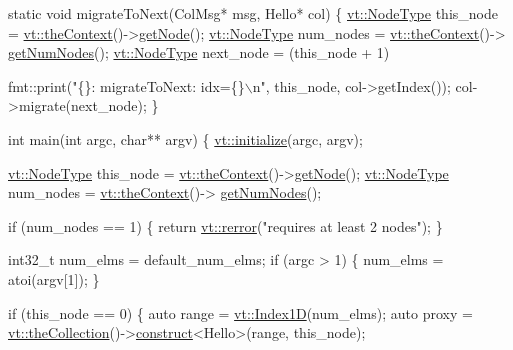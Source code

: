 \begin{DoxyCodeInclude}
\textcolor{keyword}{static} \textcolor{keywordtype}{void} migrateToNext(ColMsg* msg, Hello* col) \{
  \hyperlink{namespacevt_a866da9d0efc19c0a1ce79e9e492f47e2}{vt::NodeType} this\_node = \hyperlink{namespacevt_a26551fe0e6e6a1371111df5b12c7e92c}{vt::theContext}()->\hyperlink{structvt_1_1ctx_1_1_context_a0d52c263ce8516546a67443d9a86fa5f}{getNode}();
  \hyperlink{namespacevt_a866da9d0efc19c0a1ce79e9e492f47e2}{vt::NodeType} num\_nodes = \hyperlink{namespacevt_a26551fe0e6e6a1371111df5b12c7e92c}{vt::theContext}()->
      \hyperlink{structvt_1_1ctx_1_1_context_a7f41071aadf6d5fa9e1b6c703c5ff19d}{getNumNodes}();
  \hyperlink{namespacevt_a866da9d0efc19c0a1ce79e9e492f47e2}{vt::NodeType} next\_node = (this\_node + 1) %

  fmt::print(\textcolor{stringliteral}{"\{\}: migrateToNext: idx=\{\}\(\backslash\)n"}, this\_node, col->getIndex());
  col->migrate(next\_node);
\}

\textcolor{keywordtype}{int} main(\textcolor{keywordtype}{int} argc, \textcolor{keywordtype}{char}** argv) \{
  \hyperlink{namespacevt_aaa266774ea8339c58be0202b00fafa62}{vt::initialize}(argc, argv);

  \hyperlink{namespacevt_a866da9d0efc19c0a1ce79e9e492f47e2}{vt::NodeType} this\_node = \hyperlink{namespacevt_a26551fe0e6e6a1371111df5b12c7e92c}{vt::theContext}()->\hyperlink{structvt_1_1ctx_1_1_context_a0d52c263ce8516546a67443d9a86fa5f}{getNode}();
  \hyperlink{namespacevt_a866da9d0efc19c0a1ce79e9e492f47e2}{vt::NodeType} num\_nodes = \hyperlink{namespacevt_a26551fe0e6e6a1371111df5b12c7e92c}{vt::theContext}()->
      \hyperlink{structvt_1_1ctx_1_1_context_a7f41071aadf6d5fa9e1b6c703c5ff19d}{getNumNodes}();

  \textcolor{keywordflow}{if} (num\_nodes == 1) \{
    \textcolor{keywordflow}{return} \hyperlink{namespacevt_aff96ace008dc847d4c0f44cfa5dfb3a0}{vt::rerror}(\textcolor{stringliteral}{"requires at least 2 nodes"});
  \}

  int32\_t num\_elms = default\_num\_elms;
  \textcolor{keywordflow}{if} (argc > 1) \{
    num\_elms = atoi(argv[1]);
  \}

  \textcolor{keywordflow}{if} (this\_node == 0) \{
    \textcolor{keyword}{auto} range = \hyperlink{namespacevt_a5540efc78234273e1796fb003fe4d234}{vt::Index1D}(num\_elms);
    \textcolor{keyword}{auto} proxy = \hyperlink{namespacevt_a1c45ce63bfd2c327ff7d76a319a371d8}{vt::theCollection}()->\hyperlink{structvt_1_1vrt_1_1collection_1_1_collection_manager_a4de84e9efd7a3948e3c20be549441cfd}{construct}<Hello>(range, this\_node);


\end{DoxyCodeInclude}
